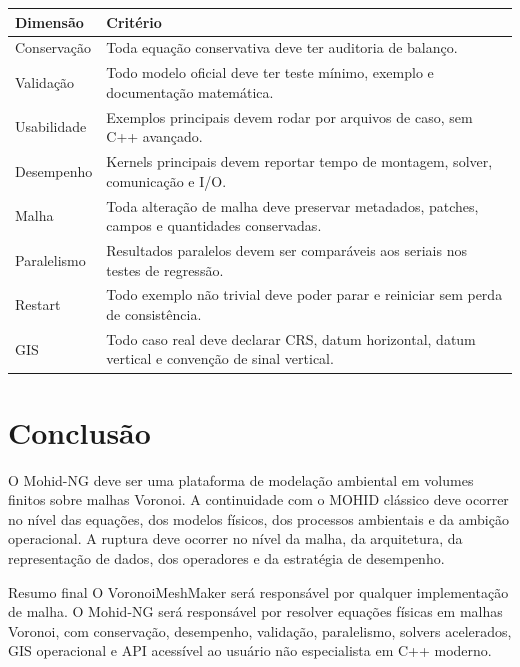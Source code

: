 \documentclass[11pt,a4paper]{article}
\begin{document}
\begin{longtable}{p{}p{}}
\toprule
\textbf{Dimens\~ao} & \textbf{Crit\'erio}\tabularnewline
\midrule
Conserva\c{c}\~ao & Toda equa\c{c}\~ao conservativa deve ter auditoria de balan\c{c}o.\tabularnewline
Valida\c{c}\~ao & Todo modelo oficial deve ter teste m\'inimo, exemplo e documenta\c{c}\~ao matem\'atica.\tabularnewline
Usabilidade & Exemplos principais devem rodar por arquivos de caso, sem C++ avan\c{c}ado.\tabularnewline
Desempenho & Kernels principais devem reportar tempo de montagem, solver, comunica\c{c}\~ao e I/O.\tabularnewline
Malha & Toda altera\c{c}\~ao de malha deve preservar metadados, patches, campos e quantidades conservadas.\tabularnewline
Paralelismo & Resultados paralelos devem ser compar\'aveis aos seriais nos testes de regress\~ao.\tabularnewline
Restart & Todo exemplo n\~ao trivial deve poder parar e reiniciar sem perda de consist\^encia.\tabularnewline
GIS & Todo caso real deve declarar CRS, datum horizontal, datum vertical e conven\c{c}\~ao de sinal vertical.\tabularnewline
\bottomrule
\end{longtable}

\section{Conclus\~ao}

O Mohid-NG deve ser uma plataforma de modela\c{c}\~ao ambiental em volumes finitos sobre malhas Voronoi. A continuidade com o MOHID cl\'assico deve ocorrer no n\'ivel das equa\c{c}\~oes, dos modelos f\'isicos, dos processos ambientais e da ambi\c{c}\~ao operacional. A ruptura deve ocorrer no n\'ivel da malha, da arquitetura, da representa\c{c}\~ao de dados, dos operadores e da estrat\'egia de desempenho.

\begin{principlebox}{Resumo final}
O VoronoiMeshMaker ser\'a respons\'avel por qualquer implementa\c{c}\~ao de malha. O Mohid-NG ser\'a respons\'avel por resolver equa\c{c}\~oes f\'isicas em malhas Voronoi, com conserva\c{c}\~ao, desempenho, valida\c{c}\~ao, paralelismo, solvers acelerados, GIS operacional e API acess\'ivel ao usu\'ario n\~ao especialista em C++ moderno.
\end{principlebox}
\end{document}
